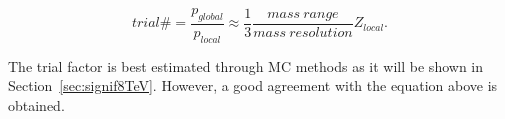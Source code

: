 \begin{equation}\label{eqn:trials}
trial\# = \frac{p_{global}}{p_{local}} \approx \frac{1}{3}\frac{mass\ range}{mass\ resolution}Z_{local}.
\end{equation}

The trial factor is best estimated through MC methods as it will be shown in Section~\ref{sec:signif8TeV}. However, a good agreement with the equation above is obtained.